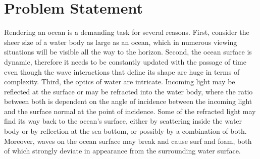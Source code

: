 \section{Problem Statement}
\label{sec:problem_statement}
%
Rendering an ocean is a demanding task for several reasons. First, consider the
sheer size of a water body as large as an ocean, which in numerous viewing
situations will be visible all the way to the horizon. Second, the ocean surface
is dynamic, therefore it needs to be constantly updated with the passage of time
even though the wave interactions that define its shape are huge in terms of complexity.
Third, the optics of water are intricate. Incoming light may be reflected at the
surface or may be refracted into the water body, where the ratio between both is
dependent on the angle of incidence between the incoming light and the surface
normal at the point of incidence. Some of the refracted light may find its way
back to the ocean's surface, either by scattering inside the water body or by
reflection at the sea bottom, or possibly by a combination of both. Moreover,
waves on the ocean surface may break and cause surf and foam,
both of which strongly deviate in appearance from the surrounding water surface.
%
%
%
%
% 
% 
%
%
%
